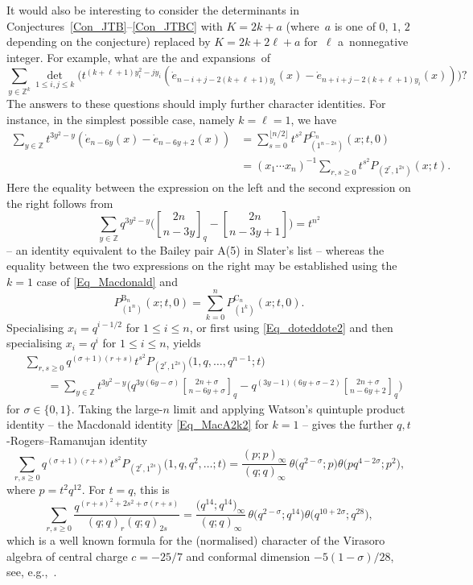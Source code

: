 \documentclass[pdftex]{sigma}
\numberwithin{equation}{section}
\renewcommand{\leq}{\leqslant}
\renewcommand{\geq}{\geqslant}
\newcommand{\floor}[1]{\lfloor#1\rfloor}
\newcommand{\qbin}[2]{\genfrac{[}{]}{0pt}{}{#1}{#2}}
\newcommand{\la}{\lambda}
\begin{document}
It would also be interesting to consider the determinants in
Conjectures~\ref{Con_JTB}--\ref{Con_JTBC} with $K=2k+a$ (where~$a$
is one of $0$, $1$, $2$ depending on the conjecture) replaced by $K=2k+2\ell+a$
for~$\ell$ a~nonnegative integer.
For example, what are the \smash{$P_{\la}^{\mathrm{C}_n}(x;t,0)$} and
\smash{$(x_1\cdots x_n)^{-k} P_{\la}(x;t)$} expansions~of%
\begin{equation}\label{Eq_generalise}
\sum_{y\in\mathbb{Z}^k} \det_{1\leq i,j\leq k}\bigl(
t^{(k+\ell+1)y_i^2-j y_i} (
\dot{e}_{n-i+j-2(k+\ell+1)y_i}(x)-
\dot{e}_{n+i+j-2(k+\ell+1)y_i}(x) )\bigr)?
\end{equation}
The answers to these questions should imply further character identities.
For instance, in the simplest possible case, namely $k=\ell=1$, we have
\begin{align*}
\sum_{y\in\mathbb{Z}}
t^{3y^2-y} (\dot{e}_{n-6y}(x)-\dot{e}_{n-6y+2}(x) )
&=\sum_{s=0}^{\floor{n/2}} t^{s^2} P_{(1^{n-2s})}^{\mathrm{C}_n}(x;t,0) \\
&=(x_1\cdots x_n)^{-1}
\sum_{r,s\geq 0} t^{s^2} P_{(2^r,1^{2s})}(x;t).
\end{align*}
Here the equality between the expression on the left and the second
expression on the right follows from
\[
\sum_{y\in\mathbb{Z}} q^{3y^2-y}\biggl( \qbin{2n}{n-3y}_q-\qbin{2n}{n-3y+1}
\biggr) = t^{n^2}
\]
-- an identity equivalent to the Bailey pair A(5) in Slater's list --
whereas the equality between the two expressions on the right may
be established using the $k=1$ case of \eqref{Eq_Macdonald} and
\[
P_{(1^n)}^{\mathrm{B}_n}(x;t,0)=
\sum_{k=0}^n P_{(1^k)}^{\mathrm{C}_n}(x;t,0).
\]
Specialising $x_i=q^{i-1/2}$ for $1\leq i\leq n$, or first using
\eqref{Eq_doteddote2} and then specialising $x_i=q^i$ for $1\leq i\leq n$,
yields
\begin{align*}
&\sum_{r,s\geq 0} q^{(\sigma+1)(r+s)} t^{s^2}
P_{(2^r,1^{2s})}\bigl(1,q,\dots,q^{n-1};t\bigr) \\
&\qquad =
\sum_{y\in\mathbb{Z}} t^{3y^2-y}
\biggl( q^{3y(6y-\sigma)}\qbin{2n+\sigma}{n-6y+\sigma}_q
-q^{(3y-1)(6y+\sigma-2)}\qbin{2n+\sigma}{n-6y+2}_q \biggr)
\end{align*}
for $\sigma\in\{0,1\}$.
Taking the large-$n$ limit and applying Watson's quintuple product
identity \cite{Watson29} -- the  Macdonald
identity \eqref{Eq_MacA2k2} for $k=1$ -- gives the further
$q,t$-Rogers--Ramanujan identity
\[
\sum_{r,s\geq 0} q^{(\sigma+1)(r+s)} t^{s^2}
P_{(2^r,1^{2s})}\bigl(1,q,q^2,\dots;t\bigr)=
\frac{(p;p)_{\infty}}{(q;q)_{\infty}}\,
\theta\bigl(q^{2-\sigma};p\bigr)\theta\bigl(pq^{4-2\sigma};p^2\bigr),
\]
where $p=t^2q^{12}$.
For $t=q$, this is
\[
\sum_{r,s\geq 0} \frac{q^{(r+s)^2+2s^2+\sigma(r+s)}}{(q;q)_r(q;q)_{2s}}=
\frac{\bigl(q^{14};q^{14}\bigr)_{\infty}}{(q;q)_{\infty}}\,
\theta\bigl(q^{2-\sigma};q^{14}\bigr)\theta\bigl(q^{10+2\sigma};q^{28}\bigr),
\]
which is a well known formula for the (normalised) character
 of the Virasoro algebra
of central charge $c=-25/7$ and conformal dimension $-5(1-\sigma)/28$,
see, e.g.,~\cite{BM96}.
\end{document}
